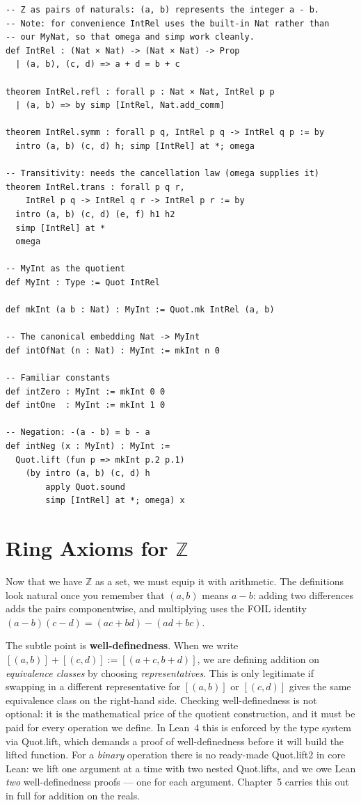 \documentclass[12pt, openany]{book}
\theoremstyle{plain}
\theoremstyle{definition}
\theoremstyle{remark}
\newcommand{\Z}{\mathbb{Z}}
\newcommand{\li}[1]{{\ttfamily\small\color{tealaccent}#1}}
\begin{document}
\begin{leanbox}
\begin{lstlisting}
-- Z as pairs of naturals: (a, b) represents the integer a - b.
-- Note: for convenience IntRel uses the built-in Nat rather than
-- our MyNat, so that omega and simp work cleanly.
def IntRel : (Nat × Nat) -> (Nat × Nat) -> Prop
  | (a, b), (c, d) => a + d = b + c

theorem IntRel.refl : forall p : Nat × Nat, IntRel p p
  | (a, b) => by simp [IntRel, Nat.add_comm]

theorem IntRel.symm : forall p q, IntRel p q -> IntRel q p := by
  intro (a, b) (c, d) h; simp [IntRel] at *; omega

-- Transitivity: needs the cancellation law (omega supplies it)
theorem IntRel.trans : forall p q r,
    IntRel p q -> IntRel q r -> IntRel p r := by
  intro (a, b) (c, d) (e, f) h1 h2
  simp [IntRel] at *
  omega

-- MyInt as the quotient
def MyInt : Type := Quot IntRel

def mkInt (a b : Nat) : MyInt := Quot.mk IntRel (a, b)

-- The canonical embedding Nat -> MyInt
def intOfNat (n : Nat) : MyInt := mkInt n 0

-- Familiar constants
def intZero : MyInt := mkInt 0 0
def intOne  : MyInt := mkInt 1 0

-- Negation: -(a - b) = b - a
def intNeg (x : MyInt) : MyInt :=
  Quot.lift (fun p => mkInt p.2 p.1)
    (by intro (a, b) (c, d) h
        apply Quot.sound
        simp [IntRel] at *; omega) x
\end{lstlisting}
\end{leanbox}
\color{black}

\section{Ring Axioms for \texorpdfstring{$\Z$}{Z}}

Now that we have $\Z$ as a set, we must equip it with arithmetic.  The definitions look natural once you remember that $(a, b)$ means $a - b$: adding two differences adds the pairs componentwise, and multiplying uses the FOIL identity $(a-b)(c-d) = (ac+bd) - (ad+bc)$.

The subtle point is \textbf{well-definedness}.  When we write $[(a,b)] + [(c,d)] := [(a+c, b+d)]$, we are defining addition on \emph{equivalence classes} by choosing \emph{representatives}.  This is only legitimate if swapping in a different representative for $[(a,b)]$ or $[(c,d)]$ gives the same equivalence class on the right-hand side.  Checking well-definedness is not optional: it is the mathematical price of the quotient construction, and it must be paid for every operation we define.  In Lean~4 this is enforced by the type system via \li{Quot.lift}, which demands a proof of well-definedness before it will build the lifted function.  For a \emph{binary} operation there is no ready-made \li{Quot.lift2} in core Lean: we lift one argument at a time with two nested \li{Quot.lift}s, and we owe Lean \emph{two} well-definedness proofs --- one for each argument.  Chapter~5 carries this out in full for addition on the reals.
\end{document}
